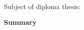 \begin{center}
	\textbf{\thesisDate}
\end{center}

\thispagestyle{empty}

\pagebreak\ \thispagestyle{empty}

\noindent Subject of diploma thesis:

\noindent \topicEN

\thispagestyle{empty}
\begin{center}
	\Large
	\textbf{Summary}

	\normalsize
	\justify
	\summaryEN
\end{center}


\pagebreak

\thispagestyle{empty}
%    
\thispagestyle{empty}

\pagestyle{empty}
\pagebreak

\normalsize

\pagebreak
\tableofcontents
\pagebreak

